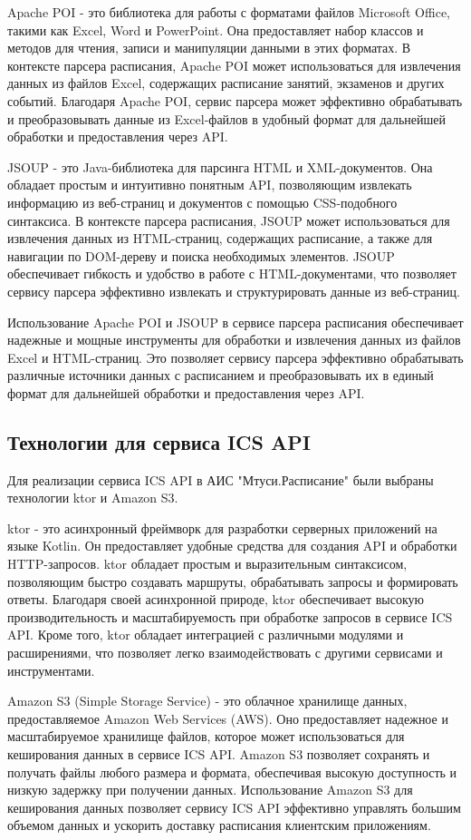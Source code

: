 Apache POI - это библиотека для работы с форматами файлов Microsoft Office,
такими как Excel, Word и PowerPoint. Она предоставляет набор классов и методов для чтения,
записи и манипуляции данными в этих форматах. В контексте парсера расписания,
Apache POI может использоваться для извлечения данных из файлов Excel,
содержащих расписание занятий, экзаменов и других событий.
Благодаря Apache POI, сервис парсера может эффективно обрабатывать и преобразовывать
данные из Excel-файлов в удобный формат для дальнейшей обработки и предоставления через API.

JSOUP - это Java-библиотека для парсинга HTML и XML-документов.
Она обладает простым и интуитивно понятным API, позволяющим извлекать информацию из веб-страниц и документов
с помощью CSS-подобного синтаксиса. В контексте парсера расписания, JSOUP может использоваться для извлечения данных из HTML-страниц,
содержащих расписание, а также для навигации по DOM-дереву и поиска необходимых элементов.
JSOUP обеспечивает гибкость и удобство в работе с HTML-документами, что
позволяет сервису парсера эффективно извлекать и структурировать данные из веб-страниц.

Использование Apache POI и JSOUP в сервисе парсера расписания обеспечивает
надежные и мощные инструменты для обработки и извлечения данных из файлов Excel и HTML-страниц.
Это позволяет сервису парсера эффективно обрабатывать различные источники данных с расписанием и преобразовывать их
в единый формат для дальнейшей обработки и предоставления через API.

\subsection{Технологии для сервиса ICS API}
Для реализации сервиса ICS API в АИС "Мтуси.Расписание" были выбраны технологии ktor и Amazon S3.

ktor - это асинхронный фреймворк для разработки серверных приложений на языке Kotlin.
Он предоставляет удобные средства для создания API и обработки HTTP-запросов.
ktor обладает простым и выразительным синтаксисом, позволяющим быстро создавать маршруты,
обрабатывать запросы и формировать ответы. Благодаря своей асинхронной природе,
ktor обеспечивает высокую производительность и масштабируемость при обработке запросов в сервисе ICS API.
Кроме того, ktor обладает интеграцией с различными модулями и расширениями, что позволяет легко взаимодействовать
с другими сервисами и инструментами.

Amazon S3 (Simple Storage Service) - это облачное хранилище данных, предоставляемое Amazon Web Services (AWS).
Оно предоставляет надежное и масштабируемое хранилище файлов, которое может использоваться для кеширования данных в сервисе ICS API.
Amazon S3 позволяет сохранять и получать файлы любого размера и формата,
обеспечивая высокую доступность и низкую задержку при получении данных.
Использование Amazon S3 для кеширования данных позволяет сервису ICS API эффективно управлять большим
объемом данных и ускорить доставку расписания клиентским приложениям.

